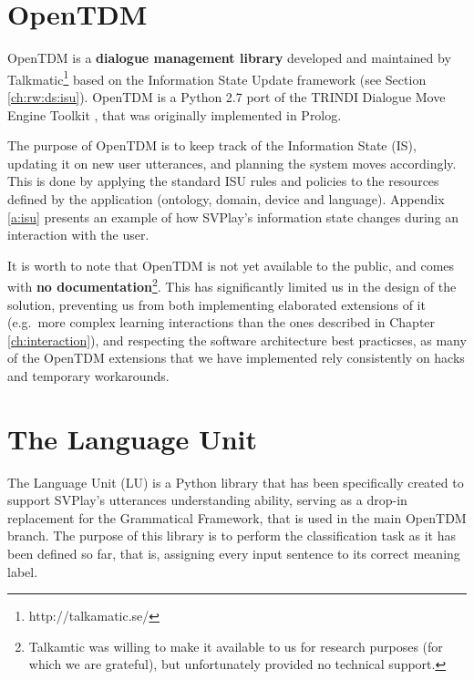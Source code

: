 \section{OpenTDM} \label{ch:arch:TDM}
OpenTDM is a \textbf{dialogue management library} developed and maintained by Talkmatic\footnote{http://talkamatic.se/} based on the Information State Update framework (see Section \ref{ch:rw:ds:isu}). OpenTDM is a Python 2.7 port of the TRINDI Dialogue Move Engine Toolkit \citep{Larsson:2000:ISD:973935.973943}, that was originally implemented in Prolog.

The purpose of OpenTDM is to keep track of the Information State (IS), updating it on new user utterances, and planning the system moves accordingly. This is done by applying the standard ISU rules and policies \citep{Larsson02issue-baseddialogue} to the resources defined by the application (ontology, domain, device and language). Appendix \ref{a:isu} presents an example of how SVPlay's information state changes during an interaction with the user.

It is worth to note that OpenTDM is not yet available to the public, and comes with \textbf{no documentation}\footnote{Talkamtic was willing to make it available to us for research purposes (for which we are grateful), but unfortunately provided no technical support.}. This has significantly limited us in the design of the solution, preventing us from both implementing elaborated extensions of it (e.g.\ more complex learning interactions than the ones described in Chapter \ref{ch:interaction}), and respecting the software architecture best practicses, as many of the OpenTDM extensions that we have implemented rely consistently on hacks and temporary workarounds.

\section{The Language Unit} \label{ch:arch:LU}
The Language Unit (LU) is a Python library that has been specifically created to support SVPlay's utterances understanding ability, serving as a drop-in replacement for the Grammatical Framework, that is used in the main OpenTDM branch. The purpose of this library is to perform the classification task as it has been defined so far, that is, assigning every input sentence to its correct meaning label.

